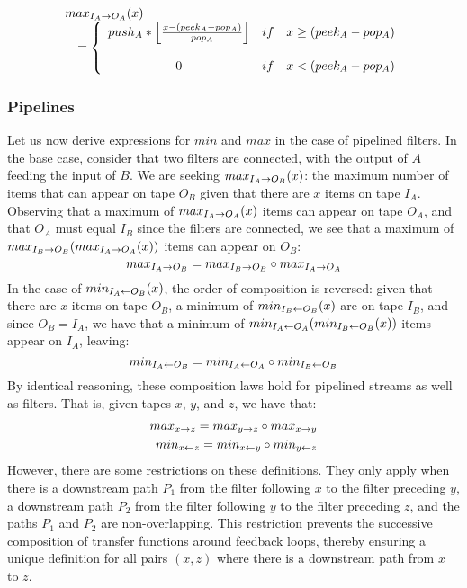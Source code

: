 \[
\begin{array}{l}
\ma{I_A}{O_A}(x)  \\ 
\makebox[.1in]{ } = \left\{
\begin{array}{ccl}
push_A*\left\lfloor\frac{x-(peek_A-pop_A)}{pop_A}\right\rfloor & if & x \ge (peek_A-pop_A) \\
 & \\
0 & if & x < (peek_A-pop_A) \\
\end{array} \right.
\end{array}
\]

\subsubsection{Pipelines}

Let us now derive expressions for $min$ and $max$ in the case of
pipelined filters.  In the base case, consider that two filters are
connected, with the output of $A$ feeding the input of $B$.  We are
seeking $max_{I_A \rightarrow O_B}(x)$: the maximum number of items that can
appear on tape $O_B$ given that there are $x$ items on tape $I_A$.
Observing that a maximum of $max_{I_A \rightarrow O_A}(x)$ items can appear on
tape $O_A$, and that $O_A$ must equal $I_B$ since the filters are
connected, we see that a maximum of
$max_{I_B \rightarrow O_B}(max_{I_A \rightarrow O_A}(x))$ items can appear on $O_B$:
\begin{equation*}
max_{I_A \rightarrow O_B} = max_{I_B \rightarrow O_B} \circ max_{I_A \rightarrow O_A}
\end{equation*}
In the case of $min_{I_A \leftarrow O_B}(x)$, the order of composition is
reversed: given that there are $x$ items on tape $O_B$, a minimum of
$min_{I_B \leftarrow O_B}(x)$ are on tape $I_B$, and since $O_B = I_A$, we have
that a minimum of $min_{I_A \leftarrow O_A}(min_{I_B \leftarrow O_B}(x))$ items appear on
$I_A$, leaving:
\begin{equation*}
min_{I_A \leftarrow O_B} = min_{I_A \leftarrow O_A} \circ min_{I_B \leftarrow O_B}
\end{equation*}
By identical reasoning, these composition laws hold for pipelined
streams as well as filters.  That is, given tapes $x$, $y$, and $z$, 
we have that:
\begin{eqnarray}
\label{eq:compose}
max_{x \rightarrow z} = max_{y \rightarrow z} \circ max_{x \rightarrow y} \\
min_{x \leftarrow z} = min_{x \leftarrow y} \circ min_{y \leftarrow z}
\end{eqnarray}
However, there are some restrictions on these definitions.  They only
apply when there is a downstream path $P_1$ from the filter following
$x$ to the filter preceding $y$, a downstream path $P_2$ from the
filter following $y$ to the filter preceding $z$, and the paths $P_1$
and $P_2$ are non-overlapping.  This restriction prevents the
successive composition of transfer functions around feedback loops,
thereby ensuring a unique definition for all pairs $(x, z)$ where
there is a downstream path from $x$ to $z$.

